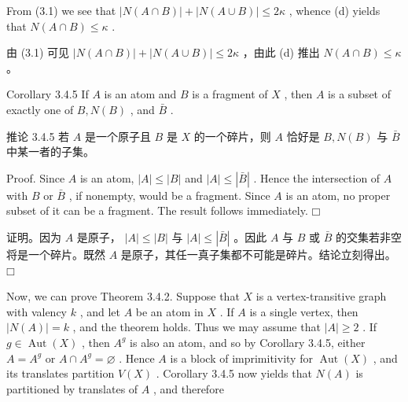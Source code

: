 \documentclass[10pt]{article}
\begin{document}
From (3.1) we see that \(\left| {N\left( {A \cap  B}\right) }\right|  + \left| {N\left( {A \cup  B}\right) }\right|  \leq  {2\kappa }\) , whence (d) yields that \(N\left( {A \cap  B}\right)  \leq  \kappa\) .

\begin{tcolorbox}\relax
由 (3.1) 可见 \(\left| {N\left( {A \cap  B}\right) }\right|  + \left| {N\left( {A \cup  B}\right) }\right|  \leq  {2\kappa }\) ，由此 (d) 推出 \(N\left( {A \cap  B}\right)  \leq  \kappa\) 。
\end{tcolorbox}

Corollary 3.4.5 If \(A\) is an atom and \(B\) is a fragment of \(X\) , then \(A\) is a subset of exactly one of \(B,N\left( B\right)\) , and \(\bar{B}\) .

\begin{tcolorbox}\relax
推论 3.4.5 若 \(A\) 是一个原子且 \(B\) 是 \(X\) 的一个碎片，则 \(A\) 恰好是 \(B,N\left( B\right)\) 与 \(\bar{B}\) 中某一者的子集。
\end{tcolorbox}

Proof. Since \(A\) is an atom, \(\left| A\right|  \leq  \left| B\right|\) and \(\left| A\right|  \leq  \left| \bar{B}\right|\) . Hence the intersection of \(A\) with \(B\) or \(\bar{B}\) , if nonempty, would be a fragment. Since \(A\) is an atom, no proper subset of it can be a fragment. The result follows immediately. \(□\)

\begin{tcolorbox}\relax
证明。因为 \(A\) 是原子， \(\left| A\right|  \leq  \left| B\right|\) 与 \(\left| A\right|  \leq  \left| \bar{B}\right|\) 。因此 \(A\) 与 \(B\) 或 \(\bar{B}\) 的交集若非空将是一个碎片。既然 \(A\) 是原子，其任一真子集都不可能是碎片。结论立刻得出。 \(□\)
\end{tcolorbox}

Now, we can prove Theorem 3.4.2. Suppose that \(X\) is a vertex-transitive graph with valency \(k\) , and let \(A\) be an atom in \(X\) . If \(A\) is a single vertex, then \(\left| {N\left( A\right) }\right|  = k\) , and the theorem holds. Thus we may assume that \(\left| A\right|  \geq  2\) . If \(g \in  \operatorname{Aut}\left( X\right)\) , then \({A}^{g}\) is also an atom, and so by Corollary 3.4.5, either \(A = {A}^{g}\) or \(A \cap  {A}^{g} = \varnothing\) . Hence \(A\) is a block of imprimitivity for \(\operatorname{Aut}\left( X\right)\) , and its translates partition \(V\left( X\right)\) . Corollary 3.4.5 now yields that \(N\left( A\right)\) is partitioned by translates of \(A\) , and therefore
\end{document}
